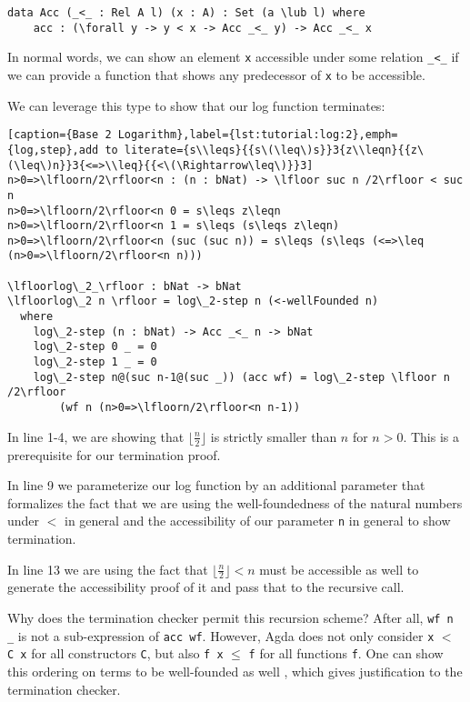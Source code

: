 \begin{lstlisting}[caption={The Acc Type},label={lst:tutorial:acc},emph={Acc,acc}]
data Acc (_<_ : Rel A l) (x : A) : Set (a \lub l) where
    acc : (\forall y -> y < x -> Acc _<_ y) -> Acc _<_ x
\end{lstlisting}

In normal words, we can show an element \texttt{x} accessible under some relation \texttt{\_<\_} if we can provide a function that shows any predecessor of \texttt{x} to be accessible.

We can leverage this type to show that our log function terminates:

\begin{lstlisting}[caption={Base 2 Logarithm},label={lst:tutorial:log:2},emph={log,step},add to literate={s\\leqs}{{s\(\leq\)s}}3{z\\leqn}{{z\(\leq\)n}}3{<=>\\leq}{{<\(\Rightarrow\leq\)}}3]
n>0=>\lfloorn/2\rfloor<n : (n : bNat) -> \lfloor suc n /2\rfloor < suc n
n>0=>\lfloorn/2\rfloor<n 0 = s\leqs z\leqn
n>0=>\lfloorn/2\rfloor<n 1 = s\leqs (s\leqs z\leqn)
n>0=>\lfloorn/2\rfloor<n (suc (suc n)) = s\leqs (s\leqs (<=>\leq (n>0=>\lfloorn/2\rfloor<n n)))

\lfloorlog\_2_\rfloor : bNat -> bNat
\lfloorlog\_2 n \rfloor = log\_2-step n (<-wellFounded n)
  where
    log\_2-step (n : bNat) -> Acc _<_ n -> bNat
    log\_2-step 0 _ = 0
    log\_2-step 1 _ = 0
    log\_2-step n@(suc n-1@(suc _)) (acc wf) = log\_2-step \lfloor n /2\rfloor
        (wf n (n>0=>\lfloorn/2\rfloor<n n-1))
\end{lstlisting}

In line 1-4, we are showing that $\lfloor \frac n 2 \rfloor$ is strictly smaller than $n$ for $n > 0$. This is a prerequisite for our termination proof.

In line 9 we parameterize our log function by an additional parameter that formalizes the fact that we are using the well-foundedness of the natural numbers under $<$ in general and the accessibility of our parameter \texttt{n} in general to show termination.

In line 13 we are using the fact that $\lfloor \frac n 2 \rfloor < n$ must be accessible as well to generate the accessibility proof of it and pass that to the recursive call.

Why does the termination checker permit this recursion scheme? After all, \texttt{wf n \_} is not a sub-expression of \texttt{acc wf}. However, Agda does not only consider \texttt{x} $<$ \texttt{C x} for all constructors \texttt{C}, but also \texttt{f x} $\leq$ \texttt{f} for all functions \texttt{f}. One can show this ordering on terms to be well-founded as well \cite{abel:2002:predicative-analysis-structural-recursion}, which gives justification to the termination checker.


